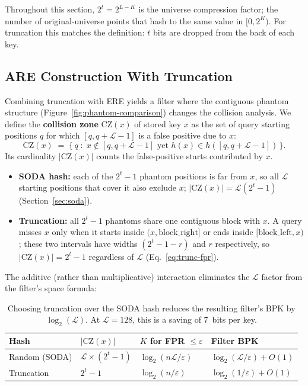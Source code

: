 \begin{remark}
    Throughout this section, $2^t = 2^{L - K}$ is the universe compression factor; the number of
    original-universe points that hash to the same value in $[0, 2^K)$.
    For truncation this matches the definition: $t$ bits are dropped from the back of each key.
\end{remark}

\subsection{ARE Construction With Truncation}

Combining truncation with ERE yields a filter where the contiguous phantom structure
(Figure~\ref{fig:phantom-comparison}) changes the collision analysis.
We define the \textbf{collision zone} $\mathrm{CZ}(x)$ of stored key $x$ as the set of
query starting positions $q$ for which $[q, q+\mathcal{L}-1]$ is a false positive due
to $x$:
\[
    \mathrm{CZ}(x) \;=\; \bigl\{\, q \;:\; x \notin [q, q+\mathcal{L}-1] \text{ yet } h(x) \in h([q, q+\mathcal{L}-1]) \,\bigr\}.
\]
Its cardinality $|\mathrm{CZ}(x)|$ counts the false-positive starts contributed by $x$.

\begin{itemize}
    \item \textbf{SODA hash:} each of the $2^t - 1$ phantom positions is far from $x$,
    so all $\mathcal{L}$ starting positions that cover it also exclude $x$;
    $|\mathrm{CZ}(x)| = \mathcal{L}(2^t - 1)$ (Section~\ref{sec:soda}).
    \item \textbf{Truncation:} all $2^t - 1$ phantoms share one contiguous block with $x$.
    A query misses $x$ only when it starts inside $(x, \text{block\_right}]$ or ends
    inside $[\text{block\_left}, x)$; these two intervals have widths $(2^t - 1 - r)$
    and $r$ respectively, so $|\mathrm{CZ}(x)| = 2^t - 1$ regardless of $\mathcal{L}$
    (Eq.~\eqref{eq:trunc-fpr}).
\end{itemize}

The additive (rather than multiplicative) interaction eliminates the $\mathcal{L}$
factor from the filter's space formula:

\begin{table}[H]
    \centering
    \begin{tabular}{@{}llll@{}}
        \toprule
        Hash & $|\mathrm{CZ}(x)|$ & $K$ for FPR $\leq \varepsilon$ & Filter BPK \\
        \midrule
        Random (SODA) & $\mathcal{L} \times (2^t-1)$ & $\log_2(n\mathcal{L}/\varepsilon)$ &
        $\log_2(\mathcal{L}/\varepsilon) + O(1)$ \\
        Truncation & $2^t - 1$ & $\log_2(n/\varepsilon)$ &
        $\log_2(1/\varepsilon) + O(1)$ \\
        \bottomrule
    \end{tabular}
    \caption{Choosing truncation over the SODA hash reduces the resulting filter's BPK by
        $\log_2(\mathcal{L})$. At $\mathcal{L} = 128$, this is a saving of 7~bits per key.}
    \label{tab:trunc-vs-soda}
\end{table}

